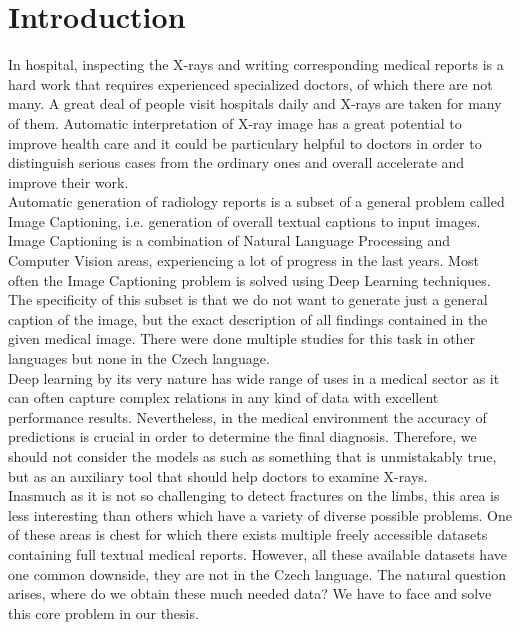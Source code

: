\chapter*{Introduction}

In hospital, inspecting the X-rays and writing corresponding medical reports is a hard work that requires experienced specialized doctors, of which there are not many. A great deal of people visit hospitals daily and X-rays are taken for many of them. Automatic interpretation of X-ray image has a great potential to improve health care and it could be particulary helpful to doctors in order to distinguish serious cases from the ordinary ones and overall accelerate and improve their work.\\

Automatic generation of radiology reports is a subset of a general problem called Image Captioning, i.e. generation of overall textual captions to input images. Image Captioning is a combination of Natural Language Processing and Computer Vision areas, experiencing a lot of progress in the last years. Most often the Image Captioning problem is solved using Deep Learning techniques. The specificity of this subset is that we do not want to generate just a general caption of the image, but the exact description of all findings contained in the given medical image. There were done multiple studies for this task in other languages but none in the Czech language.\\

Deep learning by its very nature has wide range of uses in a medical sector as it can often capture complex relations in any kind of data with excellent performance results. Nevertheless, in the medical environment the accuracy of predictions is crucial in order to determine the final diagnosis. Therefore, we should not consider the models as such as something that is unmistakably true, but as an auxiliary tool that should help doctors to examine X-rays.\\

Inasmuch as it is not so challenging to detect fractures on the limbs, this area is less interesting than others which have a variety of diverse possible problems. One of these areas is chest for which there exists multiple freely accessible datasets containing full textual medical reports. However, all these available datasets have one common downside, they are not in the Czech language. The natural question arises, where do we obtain these much needed data? We have to face and solve this core problem in our thesis.\\

